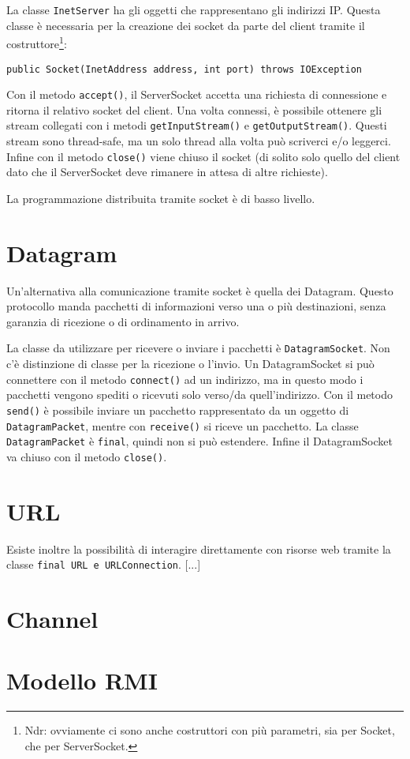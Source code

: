 La classe \texttt{InetServer} ha gli oggetti che rappresentano gli indirizzi IP. Questa classe è necessaria per la creazione dei socket da parte del client tramite il costruttore\footnote{Ndr: ovviamente ci sono anche costruttori con più parametri, sia per Socket, che per ServerSocket.}:
\begin{lstlisting}
public Socket(InetAddress address, int port) throws IOException
\end{lstlisting}
Con il metodo \texttt{accept()}, il ServerSocket accetta una richiesta di connessione e ritorna il relativo socket del client. Una volta connessi, è possibile ottenere gli stream collegati con i metodi \texttt{getInputStream()} e \texttt{getOutputStream()}. Questi stream sono thread-safe, ma un solo thread alla volta può scriverci e/o leggerci. Infine con il metodo \texttt{close()} viene chiuso il socket (di solito solo quello del client dato che il ServerSocket deve rimanere in attesa di altre richieste). 

La programmazione distribuita tramite socket è di basso livello.

\section{Datagram}
Un'alternativa alla comunicazione tramite socket è quella dei Datagram. Questo protocollo manda pacchetti di informazioni verso una o più destinazioni, senza garanzia di ricezione o di ordinamento in arrivo. 

La classe da utilizzare per ricevere o inviare i pacchetti è \texttt{DatagramSocket}. Non c'è distinzione di classe per la ricezione o l'invio. Un DatagramSocket si può connettere con il metodo \texttt{connect()} ad un indirizzo, ma in questo modo i pacchetti vengono spediti o ricevuti solo verso/da quell'indirizzo. Con il metodo \texttt{send()} è possibile inviare un pacchetto rappresentato da un oggetto di \texttt{DatagramPacket}, mentre con \texttt{receive()} si riceve un pacchetto. La classe \texttt{DatagramPacket} è \texttt{final}, quindi non si può estendere. Infine il DatagramSocket va chiuso con il metodo \texttt{close()}.

\section{URL}
Esiste inoltre la possibilità di interagire direttamente con risorse web tramite la classe \texttt{final URL e URLConnection}. [...]

\section{Channel}

\section{Modello RMI}
